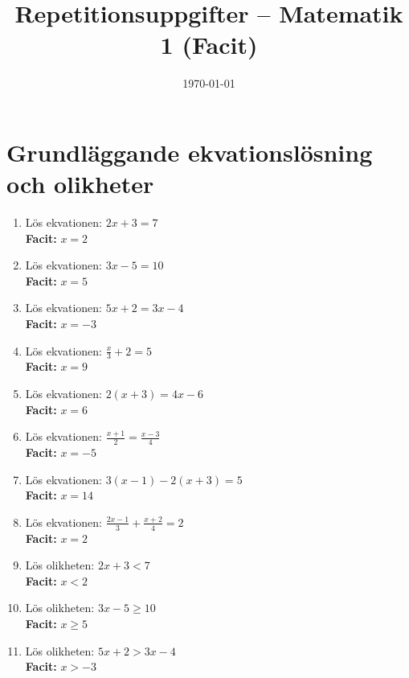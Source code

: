 \documentclass[a4paper,11pt]{article}
\title{Repetitionsuppgifter -- Matematik 1 (Facit)}
\author{}
\date{\today}
\begin{document}
\maketitle

\section*{Grundläggande ekvationslösning och olikheter}

\begin{enumerate}[label=\textbf{\arabic*.}]
    \item Lös ekvationen: $2x + 3 = 7$
    \\ \textbf{Facit:} $x = 2$
    
    \item Lös ekvationen: $3x - 5 = 10$
    \\ \textbf{Facit:} $x = 5$
    
    \item Lös ekvationen: $5x + 2 = 3x - 4$
    \\ \textbf{Facit:} $x = -3$
    
    \item Lös ekvationen: $\frac{x}{3} + 2 = 5$
    \\ \textbf{Facit:} $x = 9$
    
    \item Lös ekvationen: $2(x + 3) = 4x - 6$
    \\ \textbf{Facit:} $x = 6$
    
    \item Lös ekvationen: $\frac{x+1}{2} = \frac{x-3}{4}$
    \\ \textbf{Facit:} $x = -5$
    
    \item Lös ekvationen: $3(x - 1) - 2(x + 3) = 5$
    \\ \textbf{Facit:} $x = 14$
    
    \item Lös ekvationen: $\frac{2x-1}{3} + \frac{x+2}{4} = 2$
    \\ \textbf{Facit:} $x = 2$
    
    \item Lös olikheten: $2x + 3 < 7$
    \\ \textbf{Facit:} $x < 2$
    
    \item Lös olikheten: $3x - 5 \geq 10$
    \\ \textbf{Facit:} $x \geq 5$
    
    \item Lös olikheten: $5x + 2 > 3x - 4$
    \\ \textbf{Facit:} $x > -3$
    

\end{enumerate}
\end{document}
